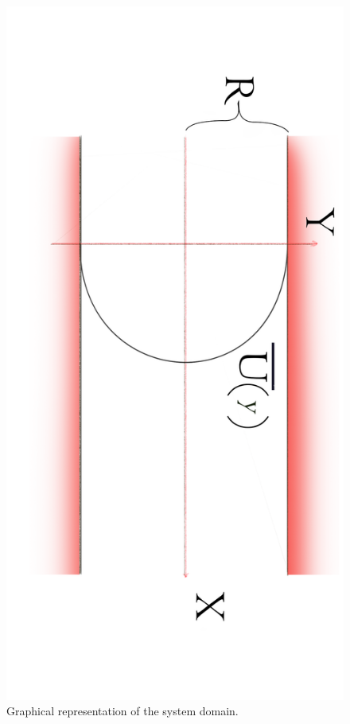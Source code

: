 \documentclass[xcolor=dvipsnames,8pt,aspectratio=34]{beamer}
\begin{document}
\begin{frame}
\begin{minipage}[h!]{0.45\textwidth}
\begin{figure}
				\includegraphics[angle=90, scale=0.06]{canalvermelho}
				\caption{Graphical representation of the system domain.}
				\label{sistema}
			\end{figure}
			\end{minipage}\\
		\end{frame}
	
\end{document}
